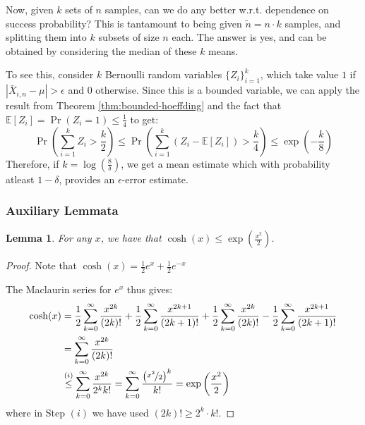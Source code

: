 \documentclass{article}
\newtheorem{lemma}{Lemma}[subsection]
\theoremstyle{remark}
\newcommand{\Exp}{\mathbb{E}}
\begin{document}
Now, given \(k\) sets of \(n\) samples, can we do any better w.r.t. dependence on success probability? This is tantamount to being given \(\tilde{n} = n\cdot k\) samples, and splitting them into \(k\) subsets of size \(n\) each. The answer is yes, and can be obtained by considering the median of these \(k\) means.

To see this, consider \(k\) Bernoulli random variables \(\{Z_{i}\}_{i=1}^{k}\), which take value \(1\) if \(|\bar{X}_{i,n} - \mu| > \epsilon\) and \(0\) otherwise. Since this is a bounded variable, we can apply the result from Theorem \ref{thm:bounded-hoeffding} and the fact that \(\Exp[Z_{i}] = \Pr(Z_{i} = 1) \leq \frac{1}{4}\) to get:
\begin{equation*}
\Pr\left(\sum_{i=1}^{k} Z_{i} > \frac{k}{2}\right) \leq \Pr\left(\sum_{i=1}^{k} (Z_{i} - \Exp[Z_{i}]) > \frac{k}{4}\right) \leq \exp\left(-\frac{k}{8}\right)
\end{equation*}
Therefore, if \(k = \log\left(\frac{8}{\delta}\right)\), we get a mean estimate which with probability atleast \(1 - \delta\), provides an \(\epsilon\)-error estimate.

\subsubsection{Auxiliary Lemmata}
\begin{lemma}
\label{lem:cosh-upper}
For any \(x\), we have that \(\cosh(x) \leq \exp\left(\frac{x^{2}}{2}\right)\).
\end{lemma}

\begin{proof}
Note that \(\cosh(x) = \frac{1}{2}e^{x} + \frac{1}{2}e^{-x}\)

The Maclaurin series for \(e^{x}\) thus gives:
\begin{align*}
\cosh(x) &= \frac{1}{2}\sum_{k=0}^{\infty} \frac{x^{2k}}{(2k)!} + \frac{1}{2}\sum_{k=0}^{\infty} \frac{x^{2k + 1}}{(2k + 1)!} + \frac{1}{2}\sum_{k=0}^{\infty} \frac{x^{2k}}{(2k)!} - \frac{1}{2}\sum_{k=0}^{\infty} \frac{x^{2k + 1}}{(2k + 1)!} \\
&= \sum_{k=0}^{\infty} \frac{x^{2k}}{(2k)!} \\
&\overset{(i)}\leq \sum_{k=0}^{\infty} \frac{x^{2k}}{2^{k}k!} = \sum_{k=0}^{\infty} \frac{\left(\nicefrac{x^{2}}{2}\right)^{k}}{k!} = \exp\left(\frac{x^{2}}{2}\right)
\end{align*}
where in Step \((i)\) we have used \((2k)! \geq 2^{k}\cdot k!\).
\end{proof}
\end{document}
